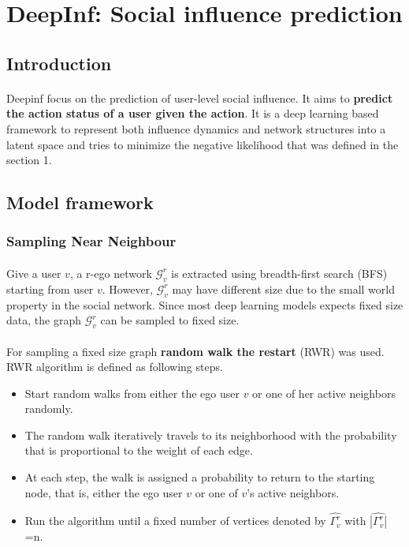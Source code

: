 \section{DeepInf: Social influence prediction}
\subsection{Introduction}
\paragraph{} Deepinf focus on the prediction of user-level social influence. It aims to \textbf{predict the action status of a user given the action}.
It is a deep learning based framework to represent both influence dynamics and network structures into a latent space and 
tries to minimize the negative likelihood that was defined in the section 1.
\subsection{Model framework}
\subsubsection{Sampling Near Neighbour}
\paragraph{} Give a user $v$, a r-ego network $\mathcal{G}_v^r$ is extracted using breadth-first search (BFS) starting from 
user $v$. However, $\mathcal{G}_v^r$ may have different size due to the small world property in the social network. Since most
deep learning models expects fixed size data, the graph $\mathcal{G}_v^r$ can be sampled to fixed size.
\paragraph{} For sampling a fixed size graph \textbf{random walk the restart} (RWR) was used. RWR algorithm is defined as
following steps.
\begin{itemize}
    \item Start random walks from either the ego user $v$ or one of her active neighbors randomly.
    \item The random walk iteratively travels to its neighborhood with the probability that is 
    proportional to the weight of each edge.
    \item At each step, the walk is assigned a probability to return to the starting node, that is, 
    either the ego user $v$ or one of $v$’s active neighbors.
    \item Run the algorithm until a fixed number of vertices denoted by $\hat{\Gamma_v^r}$ with $\hat{|\Gamma_v^r|}$=n. 
\end{itemize}
